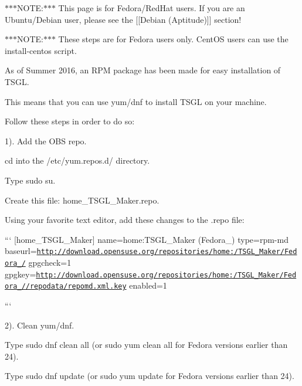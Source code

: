 $\ast$$\ast$$\ast$\-N\-O\-T\-E\-:$\ast$$\ast$$\ast$ This page is for Fedora/\-Red\-Hat users. If you are an Ubuntu/\-Debian user, please see the \mbox{[}\mbox{[}Debian (Aptitude)\mbox{]}\mbox{]} section!

$\ast$$\ast$$\ast$\-N\-O\-T\-E\-:$\ast$$\ast$$\ast$ These steps are for Fedora users only. Cent\-O\-S users can use the {\ttfamily install-\/centos} script.

As of Summer 2016, an R\-P\-M package has been made for easy installation of T\-S\-G\-L.

This means that you can use yum/dnf to install T\-S\-G\-L on your machine.

Follow these steps in order to do so\-:

1). Add the O\-B\-S repo.


\begin{DoxyItemize}
\item {\ttfamily cd} into the {\ttfamily /etc/yum.repos.\-d/} directory.
\item Type {\ttfamily sudo su}.
\item Create this file\-: {\ttfamily home\-\_\-\-T\-S\-G\-L\-\_\-\-Maker.\-repo}.
\item Using your favorite text editor, add these changes to the {\ttfamily .repo} file\-:
\end{DoxyItemize}

``` \mbox{[}home\-\_\-\-T\-S\-G\-L\-\_\-\-Maker\mbox{]} name=home\-:T\-S\-G\-L\-\_\-\-Maker (Fedora\-\_) type=rpm-\/md baseurl=\href{http://download.opensuse.org/repositories/home:/TSGL_Maker/Fedora_24/}{\tt http\-://download.\-opensuse.\-org/repositories/home\-:/\-T\-S\-G\-L\-\_\-\-Maker/\-Fedora\-\_/} gpgcheck=1 gpgkey=\href{http://download.opensuse.org/repositories/home:/TSGL_Maker/Fedora_24//repodata/repomd.xml.key}{\tt http\-://download.\-opensuse.\-org/repositories/home\-:/\-T\-S\-G\-L\-\_\-\-Maker/\-Fedora\-\_//repodata/repomd.\-xml.\-key} enabled=1

```

2). Clean yum/dnf.


\begin{DoxyItemize}
\item Type {\ttfamily sudo dnf clean all} (or {\ttfamily sudo yum clean all} for Fedora versions earlier than 24).
\item Type {\ttfamily sudo dnf update} (or {\ttfamily sudo yum update} for Fedora versions earlier than 24).
\end{DoxyItemize}

